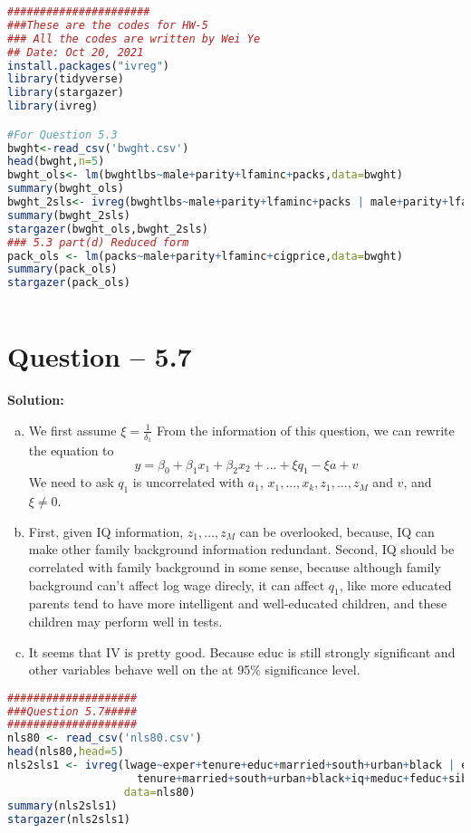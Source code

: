 \documentclass[11pt]{article} %
\begin{document}
\begin{lstlisting}[language=R]
	######################
###These are the codes for HW-5
### All the codes are written by Wei Ye
## Date: Oct 20, 2021
install.packages("ivreg")
library(tidyverse)
library(stargazer)
library(ivreg)

#For Question 5.3
bwght<-read_csv('bwght.csv')
head(bwght,n=5)
bwght_ols<- lm(bwghtlbs~male+parity+lfaminc+packs,data=bwght)
summary(bwght_ols)
bwght_2sls<- ivreg(bwghtlbs~male+parity+lfaminc+packs | male+parity+lfaminc+cigprice,data=bwght)
summary(bwght_2sls)
stargazer(bwght_ols,bwght_2sls)
### 5.3 part(d) Reduced form
pack_ols <- lm(packs~male+parity+lfaminc+cigprice,data=bwght)
summary(pack_ols)
stargazer(pack_ols)
	
\end{lstlisting}


\section{Question -- 5.7}
\textbf{Solution:}
\begin{enumerate}[a)]
   \item We first assume $\xi=\frac{1}{\delta_1}$ From the information of this question, we can rewrite the equation to 
   \begin{equation*}
      y=\beta_0+\beta_1x_1+\beta_2x_2+ ... +\xi q_1-\xi a+v
   \end{equation*}
   We need to ask $q_1$ is uncorrelated with $a_1$, $x_1,...,x_k,z_1,...,z_M$ and $v$, and $\xi \neq 0$.
   \item First, given IQ information, $z_1,...,z_M$ can be overlooked, because, IQ can make other family background information redundant. Second, IQ should be correlated with family background in some sense, because although family
         background can't affect log wage direcly, it can affect $q_1$, like more educated parents tend to have more intelligent and well-educated children, and these children may perform well in tests.
   \item It seems that IV is pretty good. Because educ is still strongly significant and other variables behave well on the at 95\% significance level. 
   
\end{enumerate}

\begin{lstlisting}[language=R]
   ####################
###Question 5.7#####
####################
nls80 <- read_csv('nls80.csv')
head(nls80,head=5)
nls2sls1 <- ivreg(lwage~exper+tenure+educ+married+south+urban+black | exper+
                    tenure+married+south+urban+black+iq+meduc+feduc+sibs,
                  data=nls80)
summary(nls2sls1)
stargazer(nls2sls1)
   
\end{lstlisting}
\end{document}
